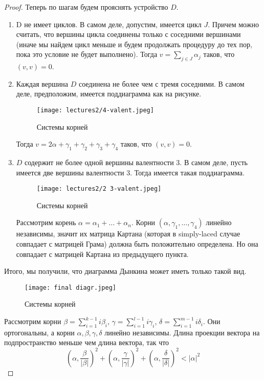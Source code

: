 \documentclass[a4article]{article}
\begin{document}
\begin{proof}
    Теперь по шагам будем прояснять устройство $D$.
    \begin{enumerate}
        \item D не имеет циклов. В самом деле, допустим, имеется цикл $J$. Причем можно считать, что вершины цикла соединены только с соседними вершинами (иначе мы найдем цикл меньше и будем продолжать процедуру до тех пор, пока это условие не будет выполнено). Тогда $v = \sum_{j \in J}\alpha_j$ таков, что $(v,v)=0$.
        \item Каждая вершина $D$ соединена не более чем с тремя соседними. В самом деле, предположим, имеется поддиаграмма как на рисунке.
        \begin{figure}[h!]
        \centering
        \texttt{[image: lectures2/4-valent.jpeg]}
        \caption{Системы корней}
        \label{fig:enter-label}
        \end{figure}
        Тогда $v = 2\alpha+\gamma_1+\gamma_2+\gamma_3+\gamma_4$ таков, что $(v,v)=0$.
        \item $D$ содержит не более одной вершины валентности 3. В самом деле, пусть имеется две вершины валентности 3. Тогда имеется такая поддиаграмма.
        \begin{figure}[h!]
        \centering
        \texttt{[image: lectures2/2 3-valent.jpeg]}
        \caption{Системы корней}
        \label{fig:enter-label}
        \end{figure}
        Рассмотрим корень $\alpha = \alpha_1 + \ldots + \alpha_n$. Корни $(\alpha, \gamma_1, \ldots, \gamma_4)$ линейно независимы, значит их матрица Картана (которая в simply-laced случае совпадает с матрицей Грама) должна быть положительно определена. Но она совпадает с матрицей Картана из предыдущего пункта. 
    \end{enumerate}
    Итого, мы получили, что диаграмма Дынкина может иметь только такой вид.
    \begin{figure}[h!]
        \centering
        \texttt{[image: final diagr.jpeg]}
        \caption{Системы корней}
        \label{fig:enter-label}
        \end{figure}
    Рассмотрим корни $\beta = \sum_{i=1}^{k-1}i\beta_i$, $\gamma = \sum_{i=1}^{l-1}i\gamma_i$, $\delta = \sum_{i=1}^{m-1}i\delta_i$. Они ортогональны, а корни $\alpha, \beta, \gamma, \delta$ линейно независимы. Длина проекции вектора на подпространство меньше чем длина вектора, так что 
    $$(\alpha, \frac{\beta}{|\beta|})^2+(\alpha, \frac{\gamma}{|\gamma|})^2+(\alpha, \frac{\delta}{|\delta|})^2<|\alpha|^2$$

\end{proof}
\end{document}
